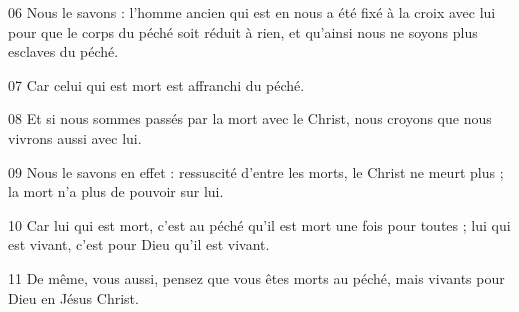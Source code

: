 
06 Nous le savons : l’homme ancien qui est en nous a été fixé à la croix avec lui pour que le corps du péché soit réduit à rien, et qu’ainsi nous ne soyons plus esclaves du péché.

07 Car celui qui est mort est affranchi du péché.

08 Et si nous sommes passés par la mort avec le Christ, nous croyons que nous vivrons aussi avec lui.

09 Nous le savons en effet : ressuscité d’entre les morts, le Christ ne meurt plus ; la mort n’a plus de pouvoir sur lui.

10 Car lui qui est mort, c'est au péché qu'il est mort une fois pour toutes ; lui qui est vivant, c'est pour Dieu qu'il est vivant.

11 De même, vous aussi, pensez que vous êtes morts au péché, mais vivants pour Dieu en Jésus Christ.
